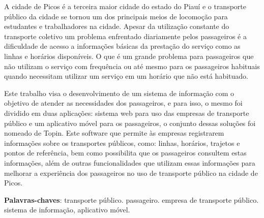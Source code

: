 \begin{resumo}
A cidade de Picos é a terceira maior cidade do estado do Piauí e o transporte público da cidade se tornou um dos principais meios de locomoção para estudantes e trabalhadores na cidade. Apesar da utilização constante do transporte coletivo um problema enfrentado diariamente pelos passageiros é a dificuldade de acesso a informações básicas da prestação do serviço como as linhas e horários disponíveis. O que é um grande problema para passageiros que não utilizam o serviço com frequência ou até mesmo para os passageiros habituais quando necessitam utilizar um serviço em um horário que não está habituado.

Este trabalho visa o desenvolvimento de um sistema de informação com o objetivo de atender as necessidades dos passageiros, e para isso, o mesmo foi dividido em duas aplicações: sistema web para uso das empresas de transporte público e um aplicativo móvel para os passageiros, o conjunto dessas soluções foi nomeado de Topin. Este software que permite às empresas registrarem informações sobre os transportes públicos, como: linhas, horários, trajetos e pontos de referência, bem como possibilita que os passageiros consultem estas informações, além de outras funcionalidades que utilizam essas informações para melhorar a experiência dos passageiros no uso de transporte público na cidade de Picos.

\vspace{\onelineskip}
\noindent
\textbf{Palavras-chaves}: transporte público. passageiro. empresa de transporte público. sistema de informação, aplicativo móvel.
\end{resumo}

